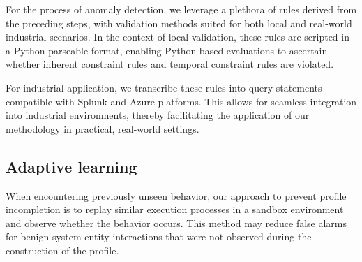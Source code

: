 For the process of anomaly detection, we leverage a plethora of rules derived from the preceding steps, with validation methods suited for both local and real-world industrial scenarios. In the context of local validation, these rules are scripted in a Python-parseable format, enabling Python-based evaluations to ascertain whether inherent constraint rules and temporal constraint rules are violated.

For industrial application, we transcribe these rules into query statements compatible with Splunk and Azure platforms. This allows for seamless integration into industrial environments, thereby facilitating the application of our methodology in practical, real-world settings.



\subsection{Adaptive learning}
When encountering previously unseen behavior, our approach to prevent profile incompletion is to replay similar execution processes in a sandbox environment and observe whether the behavior occurs. This method may reduce false alarms for benign system entity interactions that were not observed during the construction of the profile.